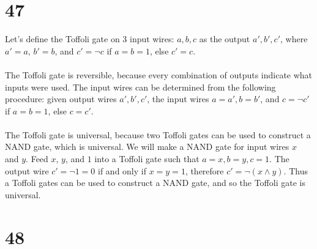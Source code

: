 \documentclass[letterpaper,notitlepage,twoside]{article}
\begin{document}
\section*{47}
Let's define the Toffoli gate on 3 input wires: $a, b, c$  as the output $a', b', c'$, where $a' = a$, $b' = b$, and $c' = \neg c$ if $a = b = 1$, else $c' = c$. \\\\
The Toffoli gate is reversible, because every combination of outputs indicate what inputs were used. The input wires can be determined from the following procedure: given output wires $a', b', c'$, the input wires $a = a', b = b'$, and $c = \neg c'$ if $a = b = 1$, else $c = c'$. \\\\
The Toffoli gate is universal, because two Toffoli gates can be used to construct a NAND gate, which is universal. We will make a NAND gate for input wires $x$ and $y$. Feed $x$, $y$, and $1$ into a Toffoli gate such that $a = x, b = y, c = 1$. The output wire $c' = \neg 1 = 0$ if and only if $x = y = 1$, therefore $c' = \neg (x \land y)$. Thus a Toffoli gates can be used to construct a NAND gate, and so the Toffoli gate is universal.

\section*{48}
\end{document}
